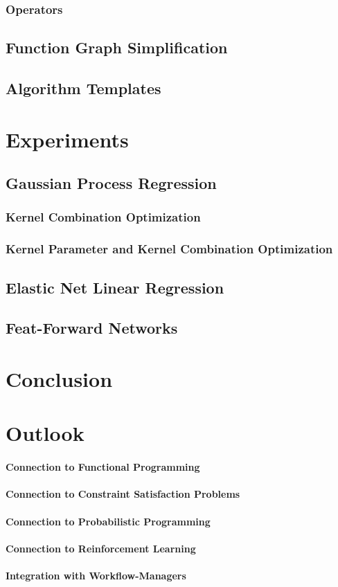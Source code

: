 \documentclass[english]{article}
\begin{document}
\subsubsection{Operators}

\subsection{Function Graph Simplification}


\subsection{Algorithm Templates}


\section{Experiments}



\subsection{Gaussian Process Regression}
\subsubsection{Kernel Combination Optimization}
\subsubsection{Kernel Parameter and Kernel Combination Optimization}
\subsection{Elastic Net Linear Regression}
\subsection{Feat-Forward Networks}

\section{Conclusion}

\section{Outlook}
\paragraph{Connection to Functional Programming}
\paragraph{Connection to Constraint Satisfaction Problems}
\paragraph{Connection to Probabilistic Programming}
\paragraph{Connection to Reinforcement Learning}
\paragraph{Integration with Workflow-Managers}


\printbibliography
\end{document}
